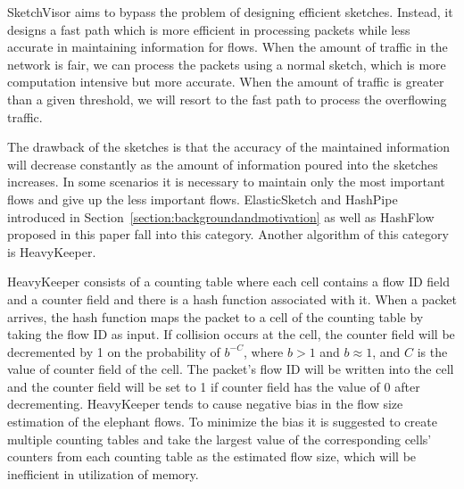 SketchVisor\cite{huang_sketchvisor:_2017} aims to bypass the problem of designing efficient sketches. Instead, it designs a fast path which is more efficient in processing packets while less accurate in maintaining information for flows. When the amount of traffic in the network is fair, we can process the packets using a normal sketch, which is more computation intensive but more accurate. When the amount of traffic is greater than a given threshold, we will resort to the fast path to process the overflowing traffic.

The drawback of the sketches is that the accuracy of the maintained information will decrease constantly as the amount of information poured into the sketches increases. In some scenarios it is necessary to maintain only the most important flows and give up the less important flows. ElasticSketch\cite{yang_elastic_2018} and HashPipe\cite{sivaraman_heavy-hitter_2017} introduced in Section~\ref{section:backgroundandmotivation} as well as HashFlow proposed in this paper fall into this category. Another algorithm of this category is HeavyKeeper. 

HeavyKeeper\cite{gong_heavykeeper:_2018} consists of a counting table where each cell contains a flow ID field and a counter field and there is a hash function associated with it. When a packet arrives, the hash function maps the packet to a cell of the counting table by taking the flow ID as input. If collision occurs at the cell, the counter field will be decremented by 1 on the probability of $b^{-C}$, where $b > 1$ and $b \approx 1$, and $C$ is the value of counter field of the cell. The packet's flow ID will be written into the cell and the counter field will be set to 1 if counter field has the value of 0 after decrementing. HeavyKeeper tends to cause negative bias in the flow size estimation of the elephant flows. To minimize the bias it is suggested to create multiple counting tables and take the largest value of the corresponding cells' counters from each counting table as the estimated flow size, which will be inefficient in utilization of memory.
